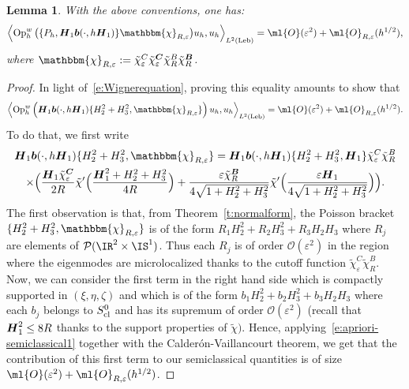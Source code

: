 \documentclass[10pt]{amsart}
\let\bm\mathbbm
\theoremstyle{plain}
\newtheorem{lemm}[theo]{Lemma}
\theoremstyle{definition}
\theoremstyle{remark}
\newcommand{\Op}{\operatorname{Op}}
\begin{document}
\begin{lemm}\label{l:remove-cutoff}
With the above conventions, one has:
\begin{equation}
\left\langle \Op_h^w\big(\{P_h, \boldsymbol{H}_1\boldsymbol{b}(\cdot,h\boldsymbol{H}_1)\} \bm{\chi}_{R,\varepsilon} \big)u_h,u_h\right\rangle_{L^2(\operatorname{Leb})}=\ml{O}(\varepsilon^2)+\ml{O}_{R,\varepsilon}(h^{1/2}),
\end{equation}
where $\bm{\chi}_{R,\varepsilon} := \tilde{\chi}_\varepsilon^C\tilde{\chi}_\varepsilon^{\boldsymbol{C}} \tilde{\chi}_R^B\tilde{\chi}_R^{\boldsymbol{B}}$.
\end{lemm}

\begin{proof}
In light of~\eqref{e:Wignerequation}, proving this equality amounts to show that
\[
\left\langle \Op_h^w\left(\boldsymbol{H}_1\boldsymbol{b}(\cdot,h\boldsymbol{H}_1)\{H_2^2+H_3^2,\bm{\chi}_{R,\varepsilon}\}\right)u_h,u_h\right\rangle_{L^2(\text{Leb})}=\ml{O}(\varepsilon^2)+\ml{O}_{R,\varepsilon}(h^{1/2}).
\]
To do that, we first write
\begin{multline*}
\boldsymbol{H}_1\boldsymbol{b}(\cdot,h\boldsymbol{H}_1)\{H_2^2+H_3^2,\bm{\chi}_{R,\varepsilon}\}=\boldsymbol{H}_1\boldsymbol{b}(\cdot,h\boldsymbol{H}_1)\{H_2^2+H_3^2,\boldsymbol{H}_1\}\tilde{\chi}_\varepsilon^C\tilde{\chi}_R^B\\
\times\Bigl(\frac{\boldsymbol{H}_1 \tilde{\chi}_\varepsilon^{\boldsymbol{C}} }{2R}\tilde{\chi}'\Bigl(\frac{\boldsymbol{H}_1^2+H_2^2+H_3^2}{4R}\Bigr)+\frac{\varepsilon\tilde{\chi}_R^{\boldsymbol{B}}}{4\sqrt{1+H_2^2+H_3^2}}\tilde{\chi}'\Bigl(\frac{\varepsilon\boldsymbol{H}_1}{4\sqrt{1+H_2^2+H_3^2}}\Bigr)\Bigr).
\end{multline*}
The first observation is that, from Theorem~\ref{t:normalform}, the Poisson bracket $\{H_2^2+H_3^2,\bm{\chi}_{R,\varepsilon}\}$ is of the form $R_1H_2^2+R_2 H_3^2+R_3H_2H_3$ where $R_j$ are elements of $\mathcal{P}(\IR^2\times\IS^1)$. Thus each $R_j$ is of order $\mathcal{O}(\varepsilon^2)$ in the region where the eigenmodes are microlocalized thanks to the cutoff function $\tilde{\chi}_\varepsilon^C\tilde{\chi}_R^B$. Now, we can consider the first term in the right hand side which is compactly supported in $(\xi,\eta,\zeta)$ and which is of the form $b_1H_2^2+b_2H_3^2+b_3H_2H_3$ where each $b_j$ belongs to $S_{\textup{cl}}^0$ and has its supremum of order $\mathcal{O}(\varepsilon^2)$ (recall that $\boldsymbol{H}_1^2\leq\nobreak 8R$ thanks to the support properties of $\tilde{\chi})$. Hence, applying~\eqref{e:apriori-semiclassical1} together with the Calderón-Vaillancourt theorem, we get that the contribution of this first term to our semiclassical quantities is of size $\ml{O}(\varepsilon^2)+\ml{O}_{R,\varepsilon}(h^{1/2})$.


\end{proof}
\end{document}

